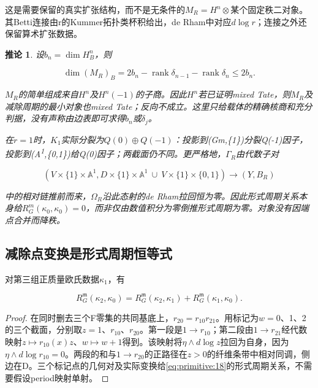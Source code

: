 \documentclass[11pt,a4paper,oneside]{ctexart}
\theoremstyle{cnplain}
\newtheorem{corollary}[theorem]{推论}
\theoremstyle{definition}
\theoremstyle{remark}
\numberwithin{equation}{section}
\begin{document}
这是需要保留的真实扩张结构，而不是无条件的\(M_R=H^n\otimes \)某个固定秩二对象。其Betti连接由r的Kummer拓扑类杯积给出，de Rham中对应\(d\log  r\)；连接之外还保留算术扩张数据。

\begin{corollary}

\label{thm:primitive:5.1} 设\(b_n=\operatorname{dim} H^n_B\)，则

\begin{equation}
\dim(M_R)_B=2b_n-\operatorname{rank}\delta_{n-1}
                         -\operatorname{rank}\delta_n\le2b_n.               \label{eq:primitive:17}
\end{equation}

\(M_R\)的简单组成来自\(H^n\)及\(H^n(-1)\)的子商。因此\(H^n\)若已证明mixed Tate，则\(M_R\)及减除周期的最小对象也mixed Tate；反向不成立。这里只给载体的精确核商和充分判据，没有声称由边表即可求得\(b_n\)或\(\delta _j\)。

在\(r=1\)时，\(K_1\)实际分裂为\(Q(0)\oplus Q(-1)\)：投影到(Gm,\{1\})分裂Q(-1)因子，投影到(A\textsuperscript{1},\{0,1\})给Q(0)因子；两截面仍不同。更严格地，\(\Gamma _R\)由代数子对

\begin{equation}
(V\times\{1\}\times\mathbb A^1,
 D\times\{1\}\times\mathbb A^1\ \cup\ V\times\{1\}\times\{0,1\})
                       \longrightarrow(Y,B_R)
\end{equation}

中的相对链推前而来，\(\Omega _R\)沿此态射的de Rham拉回恒为零。因此形式周期关系本身给\(R_G^m(\kappa _0,\kappa _0)=0\)，而非仅由数值积分为零倒推形式周期为零。对象没有因端点合并而降秩。

\end{corollary}


\subsection{减除点变换是形式周期恒等式}\label{sec:primitive:6}

对第三组正质量欧氏数据\(\kappa _1\)，有

\begin{equation}
R_G^{\mathfrak m}(\kappa_2,\kappa_0)
 =R_G^{\mathfrak m}(\kappa_2,\kappa_1)
                         +R_G^{\mathfrak m}(\kappa_1,\kappa_0).              \label{eq:primitive:18}
\end{equation}

\begin{proof}

在同时删去三个F零集的共同基底上，\(r_{20}=r_{10}r_{21}\)。用标记为\(w=0\)、1、2的三个截面，分别取\(z=1\)、\(r_{10}\)、\(r_{20}\)。第一段是\(1\to r_{10}\)；第二段由\(1\to r_{21}\)经代数映射\(z\mapsto r_{10}(x)z\)、\(w\mapsto w+1\)得到。该映射将\(\eta \wedge d\log  z\)拉回为自身，因为\(\eta \wedge d\log  r_{10}=0\)。两段的和与\(1\to r_{20}\)的正路径在\(z>0\)的纤维条带中相对同调，侧边在D。三个标记点的几何对及实际变换给\eqref{eq:primitive:18}的形式周期关系，不需要假设period映射单射。

\end{proof}
\end{document}
